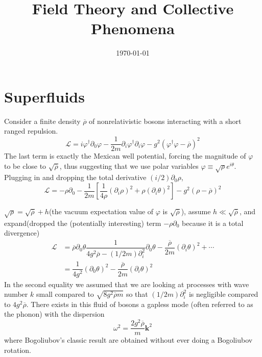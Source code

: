 \documentclass[11pt,a4paper]{article}
\title{Field Theory and Collective Phenomena}
\author{}
\date{\today}
\renewcommand{\vec}[1]{\boldsymbol{#1}}
\begin{document}
\maketitle

\section{Superfluids}
\cite{2010qftn.book.....Z}
Consider a finite density $\overline{\rho}$ of nonrelativistic bosons interacting with a short ranged repulsion.
\begin{equation}
\mathcal L = i \varphi^{\dagger} \partial_0 \varphi - \dfrac{1}{2m} \partial_i \varphi^{\dagger} \partial_i \varphi - g^2 (\varphi^{\dagger} \varphi - \overline{\rho})^2
\end{equation}
The last term is exactly the Mexican well potential,  forcing the magnitude of $\varphi$ to be close to $\sqrt{\overline{\rho}}$, thus suggesting that we use polar variables $\varphi \equiv \sqrt{\rho} e^{i\theta}$. Plugging in and dropping the total derivative $(i/2)\partial_0 \rho$, 
\begin{equation}
\mathcal L = -\rho \partial_0 -\dfrac{1}{2m} \left[\dfrac{1}{4 \rho} (\partial_i \rho)^2 +\rho (\partial_i \theta)^2 \right] - g^2 (\rho - \overline{\rho})^2 
\end{equation}

$\sqrt{\rho} = \sqrt{\overline{\rho}} +h$(the vacuum expectation value of $\varphi$ is $\sqrt{\overline{\rho}}$), assume $h \ll \sqrt{\overline{\rho}}$, and expand(dropped the (potentially interesting) term $ -\rho \partial_0$ because it is a total divergence)
\begin{align}
\nonumber \mathcal L &= \overline{\rho} \partial_0 \theta \dfrac{1}{4 g^2 \overline{\rho} - (1/2m)\partial_i^2} \partial_0 \theta - \dfrac{\overline{\rho}}{2m} (\partial_i \theta)^2 +\cdots \\
&= \dfrac{1}{4g^2} (\partial_0 \theta)^2 - \dfrac{\overline{\rho}}{2m} (\partial_i \theta)^2
\end{align}
In the second equality we assumed that we are looking at processes with wave number $k$ small compared to $\sqrt{8g^2\overline{ρ}m}$ so that $(1/2m)\partial_i^2$ is negligible compared to $4g^2 \overline{\rho}$. There exists in this fluid of bosons a gapless mode (often referred to as the phonon) with the dispersion
\begin{equation}
\omega^2 = \dfrac{2g^2 \overline{\rho}}{m} \vec{k}^2
\label{disper}
\end{equation}
where Bogoliubov's classic result are obtained without ever doing a Bogoliubov rotation.
\end{document}
